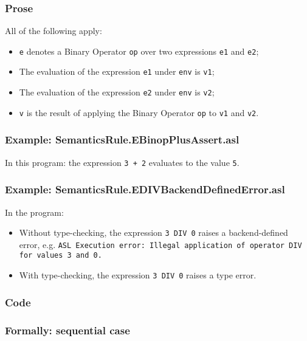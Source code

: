 \documentclass{book}
\begin{document}
  \subsubsection{Prose}
  All of the following apply:
  \begin{itemize}
  \item \texttt{e} denotes a Binary Operator \texttt{op} over two expressions \texttt{e1} and \texttt{e2};
  \item The evaluation of the expression \texttt{e1} under \texttt{env} is \texttt{v1};
  \item The evaluation of the expression \texttt{e2} under \texttt{env} is \texttt{v2};
  \item \texttt{v} is the result of applying the Binary Operator \texttt{op} to \texttt{v1} and \texttt{v2}.
  \end{itemize}

  \subsubsection{Example: SemanticsRule.EBinopPlusAssert.asl}
    In this program:
    the expression \texttt{3 + 2} evaluates to the value \texttt{5}.

  \subsubsection{Example: SemanticsRule.EDIVBackendDefinedError.asl}
    In the program:
    \begin{itemize}
    \item Without type-checking, the expression \texttt{3 DIV 0} raises a backend-defined
      error, e.g.
      \texttt{ASL Execution error: Illegal application of operator DIV for values 3 and 0.}
    \item With type-checking, the expression \texttt{3 DIV 0} raises a type error.
    \end{itemize}

  \subsubsection{Code}

  \subsubsection{Formally: sequential case}
  
\end{document}
